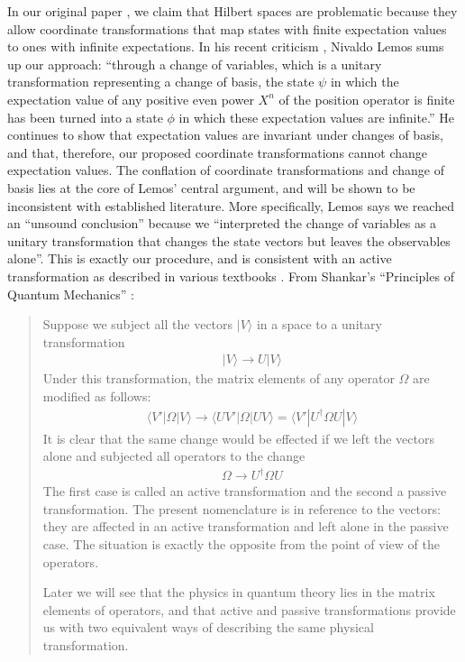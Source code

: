 \documentclass[pdflatex,sn-mathphys-num]{sn-jnl}
\begin{document}
In our original paper \cite{carcassi}, we claim that Hilbert spaces are problematic because they allow coordinate transformations that map states with finite expectation values to ones with infinite expectations. In his recent criticism \cite{lemos}, Nivaldo Lemos sums up our approach: ``through a change of variables, which is a unitary transformation representing a change of basis, the state $\psi$ in which the expectation value of any positive even power $X^n$ of the position operator is finite has been turned into a state $\phi$ in which these expectation values are infinite.'' He continues to show that expectation values are invariant under changes of basis, and that, therefore, our proposed coordinate transformations cannot change expectation values. The conflation of coordinate transformations and change of basis lies at the core of Lemos' central argument, and will be shown to be inconsistent with established literature. More specifically, Lemos says we reached an ``unsound conclusion'' because we ``interpreted the change of variables as a unitary transformation that changes the state vectors but leaves the observables alone''. This is exactly our procedure, and is consistent with an active transformation as described in various textbooks \cite{gottfried2, ballentine, binney}. From Shankar's ``Principles of Quantum Mechanics'' \cite{shankar}:

\begin{quote}
    Suppose we subject all the vectors \(|V\rangle\) in a space to a unitary transformation
\begin{align}
    |V \rangle \rightarrow U |V \rangle
\end{align}
Under this transformation, the matrix elements of any operator \(\Omega\) are modified as follows: 
\begin{align}
    \langle V' | \Omega | V \rangle \rightarrow \langle UV' | \Omega | UV \rangle = \langle V' | U^\dag \Omega U |V\rangle
\end{align}
It is clear that the same change would be effected if we left the vectors alone and subjected all operators to the change
\begin{align}
    \Omega \rightarrow U^\dag \Omega U
\end{align}
The first case is called an active transformation and the second a passive transformation. The present nomenclature is in reference to the vectors: they are affected in an active transformation and left alone in the passive case. The situation is exactly the opposite from the point of view of the operators. 

Later we will see that the physics in quantum theory lies in the matrix elements of operators, and that active and passive transformations provide us with two equivalent ways of describing the same physical transformation. 

\end{quote}
\end{document}
